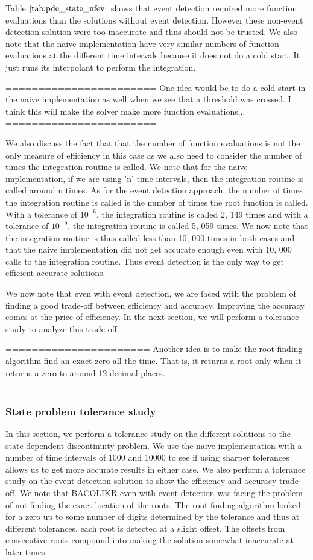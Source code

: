 \documentclass{article}
\begin{document}
Table $\ref{tab:pde_state_nfev}$ shows that event detection required more function evaluations than the solutions without event detection. However these non-event detection solution were too inaccurate and thus should not be trusted. We also note that the naive implementation have very similar numbers of function evaluations at the different time intervals because it does not do a cold start. It just runs its interpolant to perform the integration.

=======================
One idea would be to do a cold start in the naive implementation as well when we see that a threshold was crossed. I think this will make the solver make more function evaluations...
=======================

We also discuss the fact that that the number of function evaluations is not the only measure of efficiency in this case as we also need to consider the number of times the integration routine is called. We note that for the naive implementation, if we are using 'n' time intervals, then the integration routine is called around n times. As for the event detection approach, the number of times the integration routine is called is the number of times the root function is called. With a tolerance of $10^{-6}$, the integration routine is called 2, 149 times and with a tolerance of $10^{-9}$, the integration routine is called 5, 059 times. We now note that the integration routine is thus called less than 10, 000 times in both cases and that the naive implementation did not get accurate enough even with 10, 000 calls to the integration routine. Thus event detection is the only way to get efficient accurate solutions.

We now note that even with event detection, we are faced with the problem of finding a good trade-off between efficiency and accuracy. Improving the accuracy comes at the price of efficiency. In the next section, we will perform a tolerance study to analyze this trade-off.

======================
Another idea is to make the root-finding algorithm find an exact zero all the time. That is, it returns a root only when it returns a zero to around 12 decimal places.
======================

\subsubsection{State problem tolerance study}
\label{subsubsection:pde_state_tol_study}
In this section, we perform a tolerance study on the different solutions to the state-dependent discontinuity problem. We use the naive implementation with a number of time intervals of 1000 and 10000 to see if using sharper tolerances allows us to get more accurate results in either case. We also perform a tolerance study on the event detection solution to show the efficiency and accuracy trade-off. We note that BACOLIKR even with event detection was facing the problem of not finding the exact location of the roots. The root-finding algorithm looked for a zero up to some number of digits determined by the tolerance and thus at different tolerances, each root is detected at a slight offset. The offsets from consecutive roots compound into making the solution somewhat inaccurate at later times. 
\end{document}
